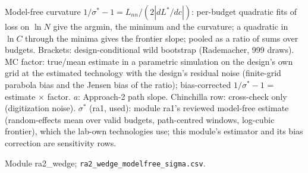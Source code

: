 \begin{table}[tp]
\centering
\caption{Model-Free Curvature and Paths of the Lab IsoFLOP Designs}
\label{tab:ra2-modelfree}
\footnotesize
\setlength{\tabcolsep}{3pt}
\ifdefined\ratabbox\else\newsavebox{\ratabbox}\fi
{}
\ifdim\wd\ratabbox>\textwidth\resizebox{\textwidth}{!}{\usebox{\ratabbox}}\else\usebox{\ratabbox}\fi\par
\begin{tablenotes}Model-free curvature $1/\sigma^*-1=L_{nn}/(2|dL^*/dc|)$: per-budget quadratic fits of loss on $\ln N$ give the argmin, the minimum and the curvature; a quadratic in $\ln C$ through the minima gives the frontier slope; pooled as a ratio of sums over budgets. Brackets: design-conditional wild bootstrap (Rademacher, 999 draws). MC factor: true/mean estimate in a parametric simulation on the design's own grid at the estimated technology with the design's residual noise (finite-grid parabola bias and the Jensen bias of the ratio); bias-corrected $1/\sigma^*-1$ = estimate $\times$ factor. $a$: Approach-2 path slope. Chinchilla row: cross-check only (digitization noise). $\sigma^*$ (ra1, used): module ra1's reviewed model-free estimate (random-effects mean over valid budgets, path-centred windows, log-cubic frontier), which the lab-own technologies use; this module's estimator and its bias correction are sensitivity rows.\end{tablenotes}
\begin{tablenotes}[Source]Module ra2\_wedge; \texttt{ra2\_wedge\_modelfree\_sigma.csv}.\end{tablenotes}
\end{table}
